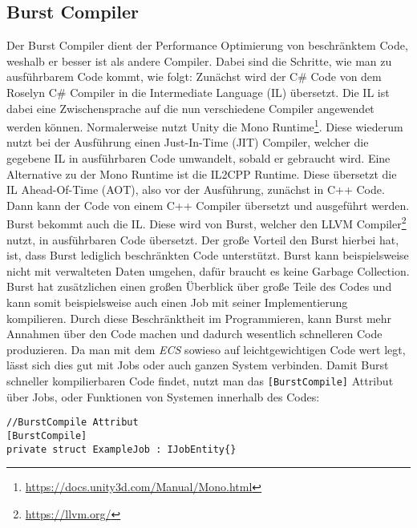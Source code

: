\subsection{Burst Compiler} \label{burst}
Der Burst Compiler dient der Performance Optimierung von beschränktem Code, weshalb er besser ist als andere Compiler. Dabei sind die Schritte, wie man zu ausführbarem Code kommt,  wie folgt: Zunächst wird der C\# Code von dem Roselyn C\# Compiler in die Intermediate Language (IL) übersetzt. Die IL ist dabei eine Zwischensprache auf die nun verschiedene Compiler angewendet werden können. Normalerweise nutzt Unity die Mono Runtime\footnote{\url{https://docs.unity3d.com/Manual/Mono.html}}. Diese wiederum nutzt bei der Ausführung einen Just-In-Time (JIT) Compiler, welcher die gegebene IL in ausführbaren Code umwandelt, sobald er gebraucht wird. Eine Alternative zu der Mono Runtime ist die IL2CPP Runtime. Diese übersetzt die IL Ahead-Of-Time (AOT), also vor der Ausführung, zunächst in C++ Code. Dann kann der Code von einem C++ Compiler übersetzt und ausgeführt werden.\\
Burst bekommt auch die IL. Diese wird von Burst, welcher den LLVM Compiler\footnote{\url{https://llvm.org/}} nutzt, in ausführbaren Code übersetzt. Der große Vorteil den Burst hierbei hat, ist, dass Burst lediglich beschränkten Code unterstützt. Burst kann beispielsweise nicht mit verwalteten Daten umgehen, dafür braucht es keine Garbage Collection. Burst hat zusätzlichen einen großen Überblick über große Teile des Codes und kann somit beispielsweise auch einen Job mit seiner Implementierung kompilieren. Durch diese Beschränktheit im Programmieren, kann Burst mehr Annahmen über den Code machen und dadurch wesentlich schnelleren Code produzieren. Da man mit dem \textit{ECS} sowieso auf leichtgewichtigen Code wert legt, lässt sich dies gut mit Jobs oder auch ganzen System verbinden. Damit Burst schneller kompilierbaren Code findet, nutzt man das \texttt{[BurstCompile]} Attribut über Jobs, oder Funktionen von Systemen innerhalb des Codes:
\begin{lstlisting}[style=code]
//BurstCompile Attribut
[BurstCompile]
private struct ExampleJob : IJobEntity{}
\end{lstlisting}
